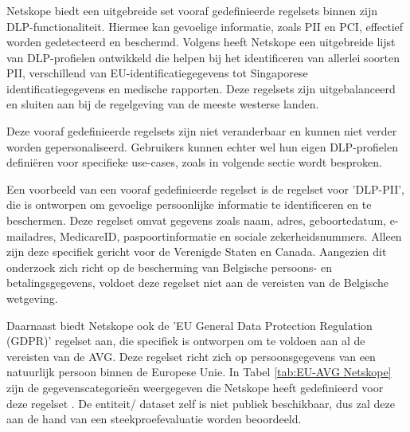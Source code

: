 \subsubsection{}
\label{subsubsec:vooraf-gedefinieerde-regels-literatuurstudie}

Netskope biedt een uitgebreide set vooraf gedefinieerde regelsets binnen zijn DLP-functionaliteit. 
Hiermee kan gevoelige informatie, zoals PII en PCI, effectief worden gedetecteerd en beschermd.
Volgens \textcite{brouwer2021cloud} heeft Netskope een uitgebreide lijst van DLP-profielen ontwikkeld die helpen bij het identificeren van allerlei soorten PII,
verschillend van EU-identificatiegegevens tot Singaporese identificatiegegevens en medische rapporten. 
Deze regelsets zijn uitgebalanceerd en sluiten aan bij de regelgeving van de meeste westerse landen. 

Deze vooraf gedefinieerde regelsets zijn niet veranderbaar en kunnen niet verder worden gepersonaliseerd. 
Gebruikers kunnen echter wel hun eigen DLP-profielen definiëren voor specifieke use-cases, zoals in volgende sectie wordt besproken. 

Een voorbeeld van een vooraf gedefinieerde regelset is de regelset voor 'DLP-PII', die is ontworpen om gevoelige persoonlijke informatie te identificeren en te beschermen. 
Deze regelset omvat gegevens zoals naam, adres, geboortedatum, e-mailadres, MedicareID, paspoortinformatie en sociale zekerheidsnummers. Alleen zijn deze specifiek gericht voor de Verenigde Staten en Canada. 
Aangezien dit onderzoek zich richt op de bescherming van Belgische persoons\-- en betalingsgegevens, voldoet deze regelset niet aan de vereisten van de Belgische wetgeving.

Daarnaast biedt Netskope ook de 'EU General Data Protection Regulation (GDPR)' regelset aan, die specifiek is ontworpen om te voldoen aan al de vereisten van de AVG. 
Deze regelset richt zich op persoonsgegevens van een natuurlijk persoon binnen de Europese Unie. 
In Tabel \ref{tab:EU-AVG Netskope} zijn de gegevenscategorieën weergegeven die Netskope heeft gedefinieerd voor deze regelset \autocite{Netskope2023GDPR}. 
De entiteit/ dataset zelf is niet publiek beschikbaar, dus zal deze aan de hand van een steekproefevaluatie worden beoordeeld. 

